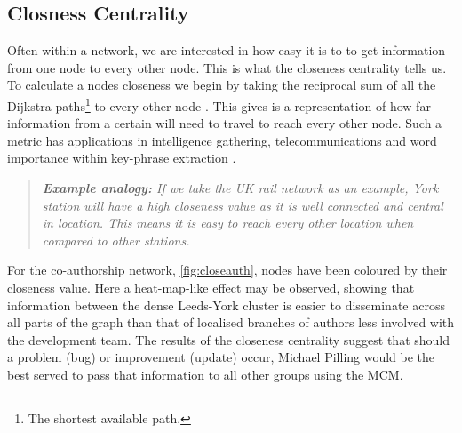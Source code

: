 




\subsection{Closness Centrality}
Often within a network, we are interested in how easy it is to to get information from one node to every other node. This is what the closeness centrality tells us. To calculate a nodes closeness we begin by taking the reciprocal sum of all the Dijkstra paths\footnote{The shortest available path.} to every other node \citep{closeness-book,closeness}. 
This gives is a representation of how far information from a certain will need to travel to reach every other node. Such a metric has applications in intelligence gathering, telecommunications and word importance within key-phrase extraction \citep{terror,examples_centrality,phrase}.

\begin{quote}
\textit{
\textbf{Example analogy:} If we take the UK rail network as an example, York station will have a high closeness value as it is well connected and central in location. This means it is easy to reach every other location when compared to other stations.
}
\end{quote}

For the co-authorship network, \autoref{fig:closeauth}, nodes have been coloured by their closeness value. Here a heat-map-like effect may be observed, showing that information between the dense Leeds-York cluster is easier to disseminate across all parts of the graph than that of localised branches of authors less involved with the development team. The results of the closeness centrality suggest that should a problem (bug) or improvement (update) occur, Michael Pilling would be the best served to pass that information to all other groups using the MCM. 

